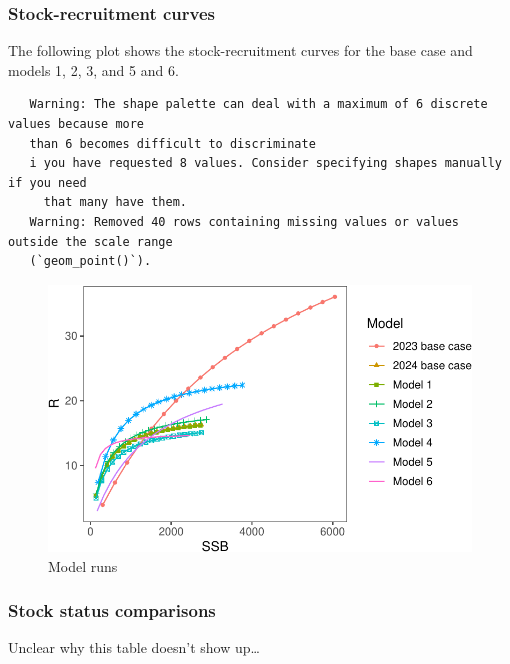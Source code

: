 \documentclass[
  letterpaper,
  DIV=11,
  numbers=noendperiod]{scrartcl}
\begin{document}
\subsubsection{Stock-recruitment curves}\label{stock-recruitment-curves}

The following plot shows the stock-recruitment curves for the base case
and models 1, 2, 3, and 5 and 6.

\begin{verbatim}
   Warning: The shape palette can deal with a maximum of 6 discrete values because more
   than 6 becomes difficult to discriminate
   i you have requested 8 values. Consider specifying shapes manually if you need
     that many have them.
   Warning: Removed 40 rows containing missing values or values outside the scale range
   (`geom_point()`).
\end{verbatim}

\begin{figure}[H]

{\centering \includegraphics{00-Namibian_hake_model_2024_files/figure-pdf/srrplots-1.pdf}

}

\caption{Model runs}

\end{figure}%

\subsubsection{Stock status comparisons}\label{stock-status-comparisons}

Unclear why this table doesn't show up\ldots{}
\end{document}
